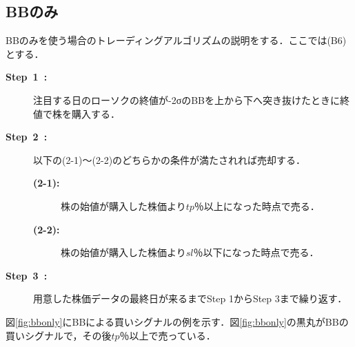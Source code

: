 \subsection{BBのみ}
BBのみを使う場合のトレーディングアルゴリズムの説明をする．ここでは(B6)とする．
\begin{description}
\item[\textbf{Step~1~:}]注目する日のローソクの終値が-2σのBBを上から下へ突き抜けたときに終値で株を購入する．

\item[\textbf{Step~2~:}]以下の(2-1)～(2-2)のどちらかの条件が満たされれば売却する．
 \begin{description}
  \item[\textbf{(2-1):}]株の始値が購入した株価より$tp$％以上になった時点で売る．
  \item[\textbf{(2-2):}]株の始値が購入した株価より$sl$％以下になった時点で売る． 
 \end{description}
\item[\textbf{Step~3~:}]用意した株価データの最終日が来るまでStep 1からStep 3まで繰り返す．
\end{description}

  
 図\ref{fig:bbonly}にBBによる買いシグナルの例を示す．図\ref{fig:bbonly}の黒丸がBBの買いシグナルで，その後$tp$％以上で売っている．
